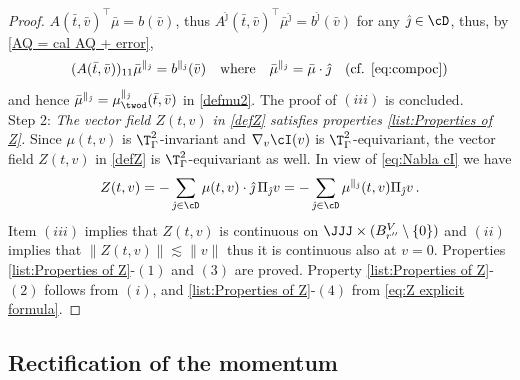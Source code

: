 \documentclass[11pt,a4paper,reqno]{article}
\numberwithin{equation}{section}
\theoremstyle{definition}
\begin{document}
\begin{proof}
       $ A(\bar t,\bar v)^\top
       \bar \mu =b(\bar v)$, thus 
       $ A^{\hat \jmath}(\bar t,\bar v)^\top \bar \mu^{\hat \jmath} = b^{\hat \jmath} (\bar v)$ for any 
       $ \hat \jmath \in \cD $, thus, by \eqref{AQ = cal AQ + error}, 
        $$
            (A(\bar t, \bar v))_{11}\bar \mu^{\parallel_{\hat \jmath}}=b^{\parallel_{\hat \jmath}}(\bar v)\quad \text{where} \quad \bar \mu^{\parallel_{\hat \jmath}}=\bar \mu\cdot \hat\jmath \quad \text{(cf. \eqref{eq:compoc})}
        $$
        and hence $\bar \mu^{\parallel_{\hat \jmath}}=\mu_{\twod}^{\parallel_{\hat \jmath}}(\bar t, \bar v)$ in \eqref{defmu2}.
        The proof of $(iii)$ is concluded.
\\[1mm]
{\sc Step 2:}
{\it The  vector field $Z(t,v)$ 
        in \eqref{defZ}
        satisfies properties \eqref{list:Properties of Z}. } 
        Since $\mu(t,v)$ is $\T^2_\Gamma$-invariant
        and $ \nabla_v  \cI(v) $ is 
        $\T^2_\Gamma$-equivariant,  the vector field $Z(t,v)$ in \eqref{defZ} is $\T^2_\Gamma$-equivariant as well.
        In view of \eqref{eq:Nabla cI} we have
        \begin{equation}\label{eq:Z explicit formula}
            Z(t,v)=-\sum_{{\hat \jmath}\in \cD}\mu(t,v)\cdot \hat\jmath\,  \Pi_{\hat \jmath}v=-\sum_{{\hat \jmath}\in \cD}\mu^{\parallel_{\hat \jmath}}(t,v)\Pi_{\hat \jmath}v\, .
        \end{equation}
        Item
        $(iii)$ implies that 
        $ Z(t,v) $ is continuous on $ \JJJ\times (B_{r''}^V \setminus \{0\})$ and
         $(ii)$ implies that 
         $ \| Z(t,v) \| \lesssim \| v \| $ thus it is continuous
         also at $ v = 0 $. 
        Properties \eqref{list:Properties of Z}-$(1)$ and $(3)$ are proved.
        Property \eqref{list:Properties of Z}-$(2)$ follows from $(i)$, and  \eqref{list:Properties of Z}-$(4)$ from \eqref{eq:Z explicit formula}.
    \end{proof}

\subsection{Rectification of the  momentum }\label{sec:MT}
\end{document}
